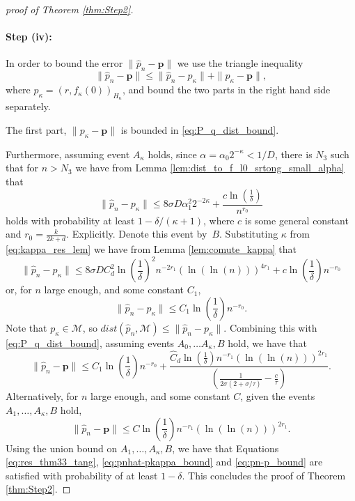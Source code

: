\documentclass[12pt]{article}
\theoremstyle{remark}
\newcommand{\MM}{\mathcal{M}}
\begin{document}
\begin{proof}[proof of Theorem \ref{thm:Step2}]
	\paragraph*{Step (iv):} In order to bound the error $\|\hat p_n - \mathrm{\mathbf{p}}\|$ we use the triangle inequality 
	\[
	\|\hat p_n - \mathrm{\mathbf{p}}\| \leq \|\hat p_n - p_\kappa\| + \| p_\kappa - \mathrm{\mathbf{p}}\|, 
	\]
	where $p_\kappa = (r,f_\kappa(0))_{H_{\kappa}}$,
	and bound the two parts in the right hand side separately.
	
	The first part, $\| p_\kappa - \mathrm{\mathbf{p}}\| $ is bounded in \eqref{eq:P_q_dist_bound}.
	
	Furthermore, assuming event $A_\kappa$ holds, since $\alpha = \alpha_0 2^{-\kappa}<1/D$, there is $N_3$ such that for $n>N_{3}$ we have from Lemma \ref{lem:dist_to_f_l0_srtong_small_alpha} that  
	\[
	\|\hat p_n - p_\kappa \| \leq 8 \sigma D \alpha_1^2 2^{-2\kappa} + \frac{c\ln\left(\frac{1}{\delta}\right)}{n^{r_0}}
	\]
	holds with probability at least $1-\delta/(\kappa+1)$, where $c$ is some general constant and $ r_0 = \frac{k}{2k +d}$. Explicitly. 
	Denote this event by~$B$.
	Substituting $\kappa$ from \eqref{eq:kappa_res_lem} we have from Lemma \ref{lem:comute_kappa} that 
	\[
	\| \hat p_n - p_\kappa \| \leq 8\sigma D C_{d}^2 \ln\left(\frac{1}{\delta}\right)^2 n^{-2r_1}\left(\ln\left(\ln(n) \right)\right)^{4r_1} + c\ln\left(\frac{1}{\delta}\right)n^{-r_0}
	\]
	or, for $n$ large enough, and some constant $ C_1$,
	\begin{equation}\label{eq:pnhat-pkappa_bound}
		\|\hat p_n - p_\kappa \| \leq C_1 \ln\left(\frac{1}{\delta}\right) n^{-r_0}.
	\end{equation}
	Note that $p_\kappa \in \MM$, so $dist(\hat p_n,\MM) \leq \|\hat p_n - p_\kappa \|$.
	Combining this with \eqref{eq:P_q_dist_bound}, assuming events $A_0,\ldots A_\kappa,B$ hold, we have that 
	\[
	\| \hat p_n - \mathrm{\mathbf{p}}\|  \leq  C_1 \ln\left(\frac{1}{\delta}\right) n^{-r_0} + \frac{\hat C_{d}\ln\left(\frac{1}{\delta}\right) n^{-r_1}\left(\ln\left(\ln(n) \right)\right)^{2r_1}}{\left(\frac{1}{2\sigma(2+\sigma/\tau)}-\frac{c}{\tau} \right)}.
	\] 
	Alternatively, for $n$ large enough, and some constant $C$, given the events $A_1,\ldots, A_\kappa, B$ hold, 
	\begin{equation} \label{eq:pn-p_bound}
		\|\hat p_n - \mathrm{\mathbf{p}}\| \leq C\ln\left(\frac{1}{\delta}\right) n^{-r_1}  \left(\ln\left(\ln(n) \right)\right)^{2r_1}.    
	\end{equation}
	Using the union bound on $A_1,\ldots, A_\kappa, B$, we have that Equations \eqref{eq:res_thm33_tang}, \eqref{eq:pnhat-pkappa_bound} and \eqref{eq:pn-p_bound} are satisfied with probability of at least $1 - \delta$.
	This concludes the proof of Theorem \ref{thm:Step2}. 
\end{proof}
\end{document}
